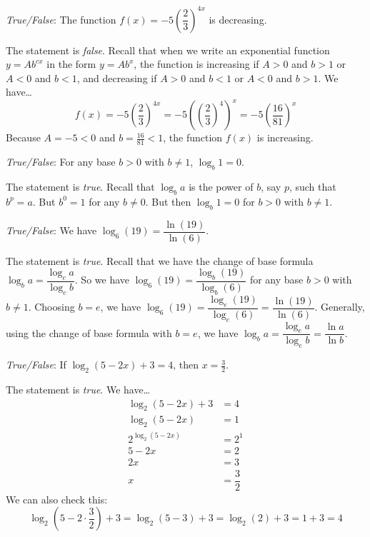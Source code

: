 \documentclass[11pt,letterpaper]{article}
\begin{document}
\quizsol \textit{True/False}: The function $f(x)= -5 \left( \dfrac{2}{3} \right)^{4x}$ is decreasing. \pspace

\sol The statement is \textit{false}. Recall that when we write an exponential function $y= Ab^{cx}$ in the form $y= Ab^x$, the function is increasing if $A > 0$ and $b > 1$ or $A < 0$ and $b < 1$, and decreasing if $A > 0$ and $b < 1$ or $A < 0$ and $b > 1$. We have\dots
	\[
	f(x)= -5 \left( \dfrac{2}{3} \right)^{4x}=  -5 \left( \left( \dfrac{2}{3} \right)^4 \right)^x= -5 \left( \dfrac{16}{81} \right)^x
	\]
Because $A= -5 < 0$ and $b= \frac{16}{81} < 1$, the function $f(x)$ is increasing. \pvspace{1.5cm}



\quizsol \textit{True/False}: For any base $b > 0$ with $b \neq 1$, $\log_b 1= 0$. \pspace

\sol The statement is \textit{true}. Recall that $\log_b a$ is the power of $b$, say $p$, such that $b^p= a$. But $b^0= 1$ for any $b \neq 0$. But then $\log_b 1= 0$ for $b > 0$ with $b \neq 1$. 



\newpage



\quizsol \textit{True/False}: We have $\log_6(19)= \dfrac{\ln(19)}{\ln(6)}$. \pspace

\sol The statement is \textit{true}. Recall that we have the change of base formula $\log_b a= \dfrac{\log_c a}{\log_c b}$. So we have $\log_6(19)= \dfrac{\log_b(19)}{\log_b(6)}$ for any base $b > 0$ with $b \neq 1$. Choosing $b= e$, we have $\log_6(19)= \dfrac{\log_e(19)}{\log_e(6)}= \dfrac{\ln(19)}{\ln(6)}$. Generally, using the change of base formula with $b= e$, we have $\log_b a= \dfrac{\log_e a}{\log_e b}= \dfrac{\ln a}{\ln b}$. \pvspace{1.5cm}



\quizsol \textit{True/False}: If $\log_2(5 - 2x) + 3= 4$, then $x= \frac{3}{2}$. \pspace

\sol The statement is \textit{true}. We have\dots
	\[
	\begin{aligned}
	\log_2(5 - 2x) + 3&= 4 \\[0.3cm]
	\log_2(5 - 2x)&= 1 \\[0.3cm]
	2^{\log_2(5 - 2x)}&= 2^1 \\[0.3cm]
	5 - 2x&= 2 \\[0.3cm]
	2x&= 3 \\[0.3cm]
	x&= \dfrac{3}{2}
	\end{aligned}
	\]
We can also check this: 
	\[
	\log_2(5 - 2 \cdot \frac{3}{2}) + 3= \log_2(5 - 3) + 3= \log_2(2) + 3= 1 + 3= 4
	\] \pvspace{1.5cm}
\end{document}

